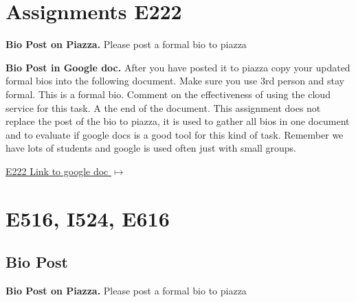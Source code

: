 

\label{c:assignments}

\section{Assignments E222}\label{s:e222-assignment}
\label{s:e222-assignments}

\begin{exercise}\label{E:bio-piazza}
{\bf Bio Post on Piazza.} Please post a formal bio to piazza
\end{exercise}
 
\begin{exercise} \label{E:bio-googledocs}

 {\bf Bio Post in Google doc.} After you have posted it to piazza copy your updated formal bios into the following document.  Make sure you use 3rd person and stay formal. This is a formal bio. Comment on the effectiveness of using the cloud service for this task. A the end of the document. This assignment does not replace the post of the bio to piazza, it is used to gather all bios in one document and to evaluate if google docs is a good tool for this kind of task. Remember we have lots of students and google is used often just with small groups.
 
 \smallskip

 {\hfill \href{https://docs.google.com/document/d/1ejzlKYqC3dLac8WXVpcPQsJh1j4BDqRxxgGg1cFQbeQ/edit?usp=sharing}{E222 Link to google doc $\mapsto$}}

 \end{exercise}


\section{E516, I524, E616}
\label{s:e516/524/616-assignments}

\subsection{Bio Post}\label{a:616-bio}

\begin{exercise}\label{E:bio-piazza}
{\bf Bio Post on Piazza.} Please post a formal bio to piazza
\end{exercise}

